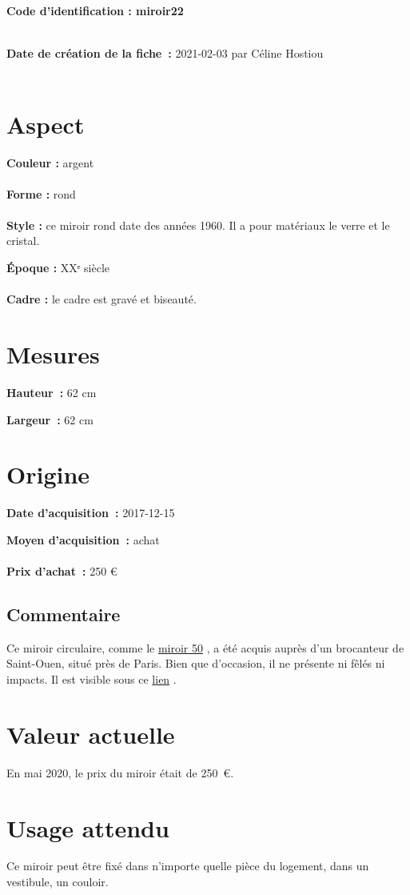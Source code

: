  
    
    
    {\bf \huge Code d’identification : miroir22}
    \\ \\ \hr
    \begin{center}
    \end{center}
    
    {\bf \large Date de création de la fiche :} 2021-02-03
    {par Céline Hostiou}
   \\ \\ \hr
    \section* {Aspect}
   {\bf \large Couleur :} argent
    \\ \\ {\bf \large Forme :}  rond
    \\ \\ {\bf \large Style :} 
            ce miroir rond date des années 1960. Il a pour matériaux le verre et
            le cristal.
        
        {\bf \large Époque :} XXᵉ siècle
    \\ \\ {\bf \large Cadre :} le cadre est gravé et biseauté.
        
    \section* {Mesures}
      
  {\bf \large Hauteur :} 62 cm
   
   {\bf \large Largeur :} 62 cm
     
    \section* {Origine}
    {\bf \large Date d’acquisition :} 2017-12-15

    {\bf \large Moyen d’acquisition :} achat
          \\ \\{\bf \large Prix d’achat :} 250 €
        
      \subsection* {Commentaire}
       
    
Ce miroir circulaire, comme le 
    \href{miroir50.xml}{miroir 50}
  ,
                a été acquis auprès d’un brocanteur de Saint-Ouen, situé près de Paris. Bien que
                d’occasion, il ne présente ni fêlés ni impacts. Il est visible sous ce  
    \href{https://www.selency.fr/produit/55V2Q3Y2/miroir-rond-grave-et-biseaute-annees-60.html}{lien}
  . 
    

      \section* {Valeur actuelle} En mai 2020, le prix du miroir était de 250 €.
      \section* {Usage attendu}  
    
Ce miroir peut être fixé dans n’importe quelle pièce du logement, dans un vestibule, un
            couloir. 
    

    
  